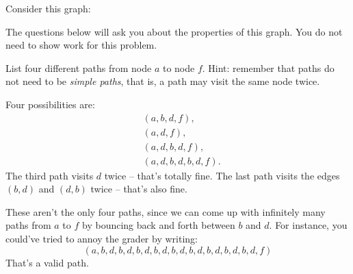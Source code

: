 \begin{prob}
    Consider this graph:
    \begin{center}
    \end{center}

    The questions below will ask you about the properties of this graph. You do
    not need to show work for this problem.

    \begin{subprobset}
        \begin{subprob}
            List four different paths from node $a$ to node $f$. Hint:
            remember that paths do not need to be \emph{simple paths}, that is, a path may visit the same node twice.

            \begin{soln}
                Four possibilities are:
                \begin{align*}
                    &(a,b,d,f),\\ 
                    &(a,d,f),\\
                    &(a,d,b,d,f),\\
                    &(a,d,b,d,b,d,f).
                \end{align*}
                The third path visits $d$ twice -- that's totally fine. The last
                path visits the edges $(b,d)$ and $(d,b)$ twice -- that's also
                fine.

                These aren't the only four paths, since we can come up with infinitely
                many paths from $a$ to $f$ by bouncing back and forth
                between $b$ and $d$. For instance, you could've tried to
                annoy the grader by writing:
                \[
                    (a,b,d,b,d,b,d,b,d,b,d,b,d,b,d,b,d,b,d,f)
                \]
                That's a valid path.
            \end{soln}
        \end{subprob}


\end{subprobset}
\end{prob}
